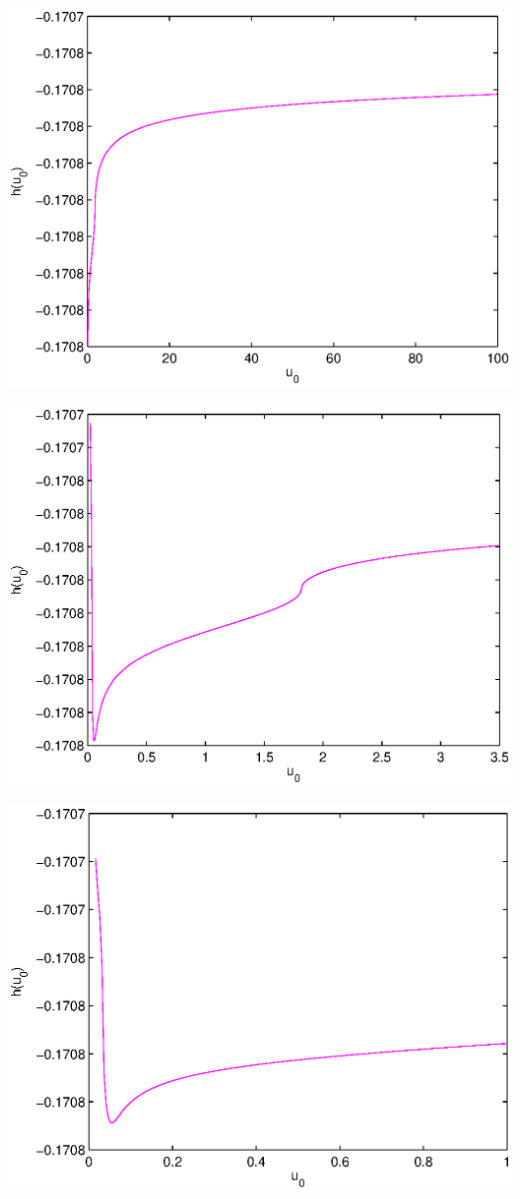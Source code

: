 \documentclass[11pt]{article}
\begin{document}
\includegraphics[scale=1.0]{pics/lyapunov_big.eps}

\includegraphics[scale=1.0]{pics/lyapunov_mid.eps}

\includegraphics[scale=1.0]{pics/lyapunov_small.eps}
\end{document}
